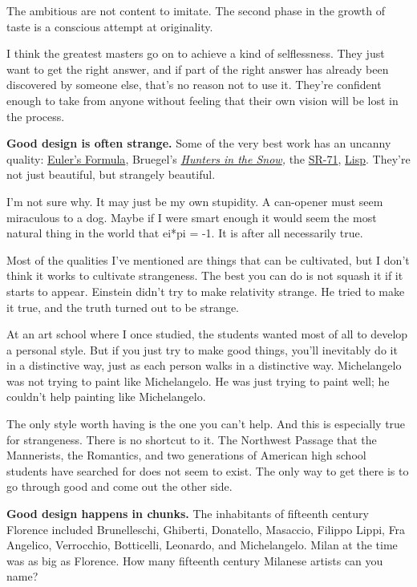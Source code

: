 \documentclass[12pt]{book}
\begin{document}
The ambitious are not content to imitate. The second phase in the growth
of taste is a conscious attempt at originality.

I think the greatest masters go on to achieve a kind of selflessness.
They just want to get the right answer, and if part of the right answer
has already been discovered by someone else, that's no reason not to use
it. They're confident enough to take from anyone without feeling that
their own vision will be lost in the process.

\textbf{Good design is often strange.} Some of the very best work has an
uncanny quality:
\href{http://mathworld.wolfram.com/EulerFormula.html}{Euler's Formula},
Bruegel's \emph{\href{hunters.html}{Hunters in the Snow},} the
\href{sr71.html}{SR-71}, \href{rootsoflisp.html}{Lisp}. They're not just
beautiful, but strangely beautiful.

I'm not sure why. It may just be my own stupidity. A can-opener must
seem miraculous to a dog. Maybe if I were smart enough it would seem the
most natural thing in the world that ei*pi = -1. It is after all
necessarily true.

Most of the qualities I've mentioned are things that can be cultivated,
but I don't think it works to cultivate strangeness. The best you can do
is not squash it if it starts to appear. Einstein didn't try to make
relativity strange. He tried to make it true, and the truth turned out
to be strange.

At an art school where I once studied, the students wanted most of all
to develop a personal style. But if you just try to make good things,
you'll inevitably do it in a distinctive way, just as each person walks
in a distinctive way. Michelangelo was not trying to paint like
Michelangelo. He was just trying to paint well; he couldn't help
painting like Michelangelo.

The only style worth having is the one you can't help. And this is
especially true for strangeness. There is no shortcut to it. The
Northwest Passage that the Mannerists, the Romantics, and two
generations of American high school students have searched for does not
seem to exist. The only way to get there is to go through good and come
out the other side.

\textbf{Good design happens in chunks.} The inhabitants of fifteenth
century Florence included Brunelleschi, Ghiberti, Donatello, Masaccio,
Filippo Lippi, Fra Angelico, Verrocchio, Botticelli, Leonardo, and
Michelangelo. Milan at the time was as big as Florence. How many
fifteenth century Milanese artists can you name?
\end{document}
